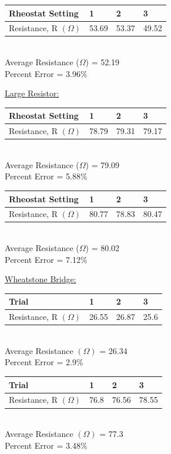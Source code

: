 \documentclass[11pt, titlepage]{article}
\begin{document}
\begin{center}
\begin{tabular}
{|m{9em}|m{7em}|m{7em}|m{7em}|}
\hline
Rheostat Setting & 1 & 2 & 3 \\
\hline
Resistance, R $(\Omega)$ & 53.69 & 53.37 & 49.52\\
\hline
\end{tabular}
\\Average Resistance ($\Omega$) = 52.19
\\Percent Error = 3.96\%
\end{center}

\underline{Large Resistor:}
\begin{center}
\begin{tabular}
{|m{9em}|m{7em}|m{7em}|m{7em}|}
\hline
Rheostat Setting & 1 & 2 & 3 \\
\hline
Resistance, R $(\Omega)$ & 78.79 & 79.31 & 79.17\\
\hline
\end{tabular}
\\Average Resistance ($\Omega$) = 79.09
\\Percent Error = 5.88\%
\end{center}

\begin{center}
\begin{tabular}
{|m{9em}|m{7em}|m{7em}|m{7em}|}
\hline
Rheostat Setting & 1 & 2 & 3 \\
\hline
Resistance, R $(\Omega)$ & 80.77 & 78.83 & 80.47\\
\hline
\end{tabular}
\\Average Resistance ($\Omega$) = 80.02
\\Percent Error = 7.12\%
\end{center}

\underline{Wheatstone Bridge:}
\begin{center}
\begin{tabular}
{|m{9em}|m{7em}|m{7em}|m{7em}|}
\hline
Trial & 1 & 2 & 3 \\
\hline
Resistance, R $(\Omega)$ & 26.55 & 26.87 & 25.6\\
\hline
\end{tabular}
\\Average Resistance $(\Omega)$ = 26.34
\\Percent Error = 2.9\%
\end{center}

\begin{center}
\begin{tabular}
{|m{9em}|m{7em}|m{7em}|m{7em}|}
\hline
Trial & 1 & 2 & 3 \\
\hline
Resistance, R $(\Omega)$ & 76.8 & 76.56 & 78.55 \\
\hline
\end{tabular}
\\Average Resistance $(\Omega)$ = 77.3
\\Percent Error = 3.48\%
\end{center}
\end{document}
